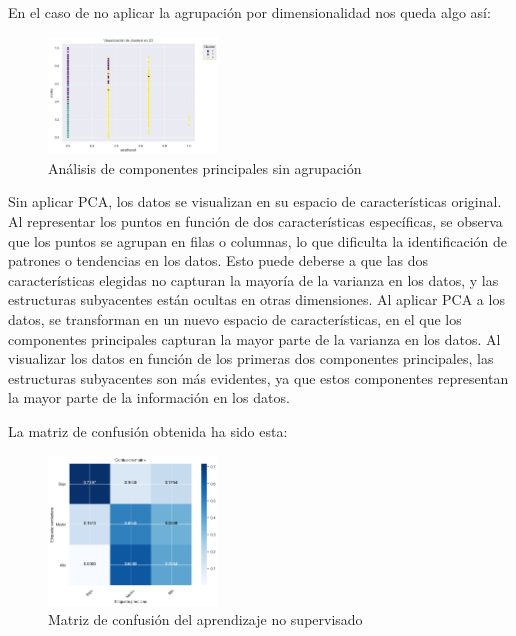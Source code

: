 \documentclass{wsdcr}
\begin{document}
En el caso de no aplicar la agrupación por dimensionalidad nos queda algo así:

\begin{figure}[h]
    \centering
    \includegraphics[width=0.4\textwidth]{charts/normalized/kmn_without_pca.png}
    \caption{Análisis de componentes principales sin agrupación}
    \label{fig:principalcomponentanalysiswithoutpca}
\end{figure}

Sin aplicar PCA, los datos se visualizan en su espacio de características original. Al representar los puntos en función de dos características específicas, se observa que los puntos se agrupan en filas o columnas, lo que dificulta la identificación de patrones o tendencias en los datos. Esto puede deberse a que las dos características elegidas no capturan la mayoría de la varianza en los datos, y las estructuras subyacentes están ocultas en otras dimensiones.
Al aplicar PCA a los datos, se transforman en un nuevo espacio de características, en el que los componentes principales capturan la mayor parte de la varianza en los datos. Al visualizar los datos en función de los primeras dos componentes principales, las estructuras subyacentes son más evidentes, ya que estos componentes representan la mayor parte de la información en los datos.

La matriz de confusión obtenida ha sido esta:
\begin{figure}[h]
    \centering
    \includegraphics[width=0.4\textwidth]{charts/normalized/kmn_matrix_confussion.png}
    \caption{Matriz de confusión del aprendizaje no supervisado}
    \label{fig:kmnmatrizconfussion}
\end{figure}
\end{document}
